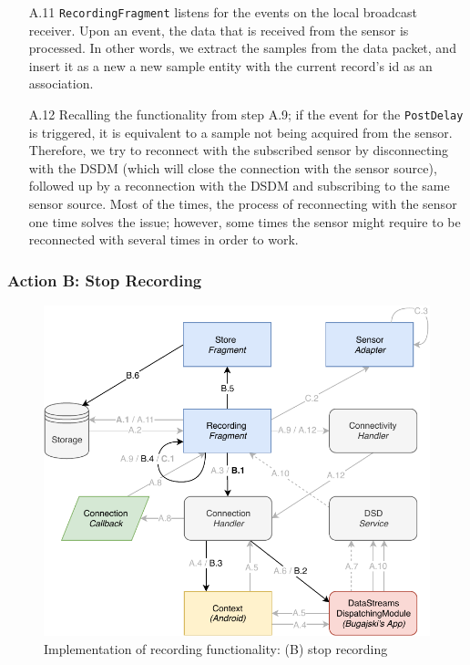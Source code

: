 \begin{itemize}
    \item[A.11] \verb|RecordingFragment| listens for the events on the local broadcast receiver. Upon an event, the data that is received from the sensor is processed. In other words, we extract the samples from the data packet, and insert it as a new a new sample entity with the current record's id as an association. 
    \item[A.12] Recalling the functionality from step A.9; if the event for the \verb|PostDelay| is triggered, it is equivalent to a sample not being acquired from the sensor. Therefore, we try to reconnect with the subscribed sensor by disconnecting with the DSDM (which will close the connection with the sensor source), followed up by a reconnection with the DSDM and subscribing to the same sensor source. Most of the times, the process of reconnecting with the sensor one time solves the issue; however, some times the sensor might require to be reconnected with several times in order to work. 
\end{itemize}

\subsubsection{Action B: Stop Recording}
\begin{figure}
    \centering
    \includegraphics[scale=0.7]{images/Recording_ImpB.pdf}
    \caption{Implementation of recording functionality: (B) stop recording}
    \label{fig:impl_recordingB}
\end{figure}

